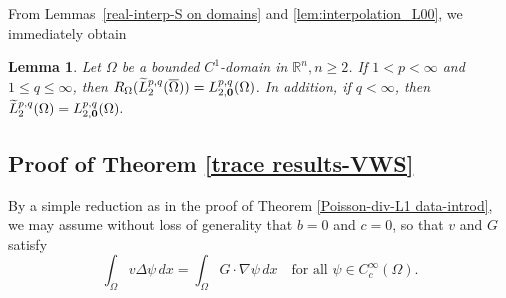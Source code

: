 \documentclass[reqno,centertags,11pt]{amsart}
\newtheorem{lem}[thm]{Lemma}
\theoremstyle{definition}
\numberwithin{thm}{section}
\numberwithin{equation}{section}
\newcommand{\R}{{\mathbb{R}}}
\begin{document}
From Lemmas~\ref{real-interp-S on domains}  and \ref{lem:interpolation_L00}, we immediately obtain

\begin{lem}\label{R-tilde equal zero vector trac}  Let $\Omega$ be  a bounded $C^{1}$-domain in $\R^n , n \ge 2  $. If   $1<p<\infty$ and $1 \le q \le \infty$,  then
$R_\Omega  ( \widetilde{L}_2^{p,q}(\overline{\Omega} )) = L_{2, {\bf 0}}^{p,q}(\Omega )$. In addition, if $  q<\infty$, then
$\widetilde{L}_2^{p,q}(\Omega ) = L_{2, {\bf 0}}^{p,q}(\Omega ).$
\end{lem}



\subsection{Proof of Theorem  \ref{trace results-VWS}}




By a simple reduction as in the proof  of Theorem  \ref{Poisson-div-L1 data-introd}, we may assume  without loss of generality that $b =0$ and $c=0$, so that $v$ and $G$ satisfy
\begin{equation}\label{dist-formulation}
\int_\Omega v   \Delta \psi\,   dx =   \int_\Omega G \cdot \nabla \psi \, d x \quad\mbox{for all}\,\, \psi \in C_c^\infty (\Omega ).
\end{equation}
\end{document}
